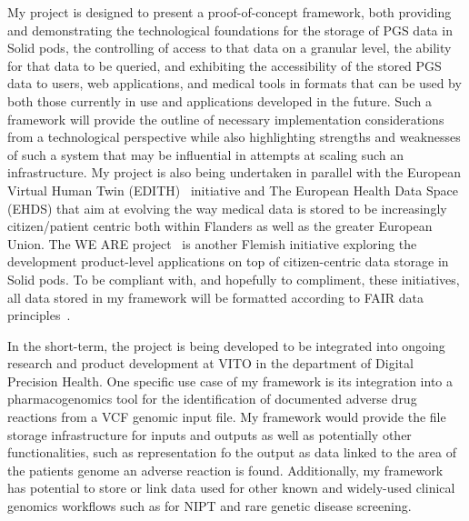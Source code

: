 \documentclass[a4paper,11pt]{article}
\begin{document}
\begin{refsection}
My project is designed to present a proof-of-concept framework, both providing and demonstrating the technological foundations for the storage of PGS data in Solid pods, the controlling of access to that data on a granular level, the ability for that data to be queried, and exhibiting the accessibility of the stored PGS data to users, web applications, and medical tools in formats that can be used by both those currently in use and applications developed in the future. 
Such a framework will provide the outline of necessary implementation considerations from a technological perspective while also highlighting strengths and weaknesses of such a system that may be influential in attempts at scaling such an infrastructure. 
My project is also being undertaken in parallel with the European Virtual Human Twin (EDITH)~\cite{edith} initiative and The European Health Data Space (EHDS) that aim at evolving the way medical data is stored to be increasingly citizen/patient centric both within Flanders as well as the greater European Union. 
The WE ARE project~\cite{we_are} is another Flemish initiative exploring the development product-level applications on top of citizen-centric data storage in Solid pods.
To be compliant with, and hopefully to compliment, these initiatives, all data stored in my framework will be formatted according to FAIR data principles~\cite{FAIR}. 

In the short-term, the project is being developed to be integrated into ongoing research and product development at VITO in the department of Digital Precision Health. 
One specific use case of my framework is its integration into a pharmacogenomics tool for the identification of documented adverse drug reactions from a VCF genomic input file.
My framework would provide the file storage infrastructure for inputs and outputs as well as potentially other functionalities, such as representation fo the output as data linked to the area of the patients genome an adverse reaction is found. 
Additionally, my framework has potential to store or link data used for other known and widely-used clinical genomics workflows such as for NIPT and rare genetic disease screening. 



\end{refsection}
\end{document}
